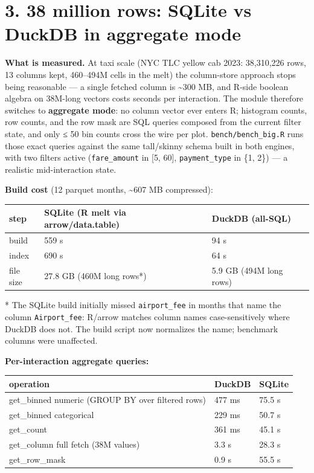 \documentclass[
  11pt,
]{article}
\newcounter{none} %
\begin{document}
\section{3. 38 million rows: SQLite vs DuckDB in aggregate
mode}\label{million-rows-sqlite-vs-duckdb-in-aggregate-mode}

\textbf{What is measured.} At taxi scale (NYC TLC yellow cab 2023:
38,310,226 rows, 13 columns kept, 460--494M cells in the melt) the
column-store approach stops being reasonable --- a single fetched column
is \textasciitilde300 MB, and R-side boolean algebra on 38M-long vectors
costs seconds per interaction. The module therefore switches to
\textbf{aggregate mode}: no column vector ever enters R; histogram
counts, row counts, and the row mask are SQL queries composed from the
current filter state, and only ≤ 50 bin counts cross the wire per plot.
\texttt{bench/bench\_big.R} runs those exact queries against the same
tall/skinny schema built in both engines, with two filters active
(\texttt{fare\_amount} in {[}5, 60{]}, \texttt{payment\_type} in \{1,
2\}) --- a realistic mid-interaction state.

\textbf{Build cost} (12 parquet months, \textasciitilde607 MB
compressed):

{\def\LTcaptype{none} %
\begin{longtable}[]{@{}lll@{}}
\toprule\noalign{}
step & SQLite (R melt via arrow/data.table) & DuckDB (all-SQL) \\
\midrule\noalign{}
\endhead
\bottomrule\noalign{}
\endlastfoot
build & 559 s & 94 s \\
index & 690 s & 64 s \\
file size & 27.8 GB (460M long rows*) & 5.9 GB (494M long rows) \\
\end{longtable}
}

* The SQLite build initially missed \texttt{airport\_fee} in months that
name the column \texttt{Airport\_fee}: R/arrow matches column names
case-sensitively where DuckDB does not. The build script now normalizes
the name; benchmark columns were unaffected.

\textbf{Per-interaction aggregate queries:}

{\def\LTcaptype{none} %
\begin{longtable}[]{@{}lll@{}}
\toprule\noalign{}
operation & DuckDB & SQLite \\
\midrule\noalign{}
\endhead
\bottomrule\noalign{}
\endlastfoot
get\_binned numeric (GROUP BY over filtered rows) & 477 ms & 75.5 s \\
get\_binned categorical & 229 ms & 50.7 s \\
get\_count & 361 ms & 45.1 s \\
get\_column full fetch (38M values) & 3.3 s & 28.3 s \\
get\_row\_mask & 0.9 s & 55.5 s \\
\end{longtable}
}
\end{document}
